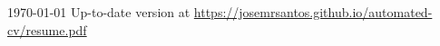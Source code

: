 \documentclass[11pt, a4paper]{awesome-cv}
\begin{document}
\makecvheader[C]

\makecvfooter
{\today}
{Up-to-date version at \upshape\color{text}\url{https://josemrsantos.github.io/automated-cv/resume.pdf}}
{\thepage}



\medskip
\vspace{1em}

\vspace{-1em}




\medskip

\end{document}
